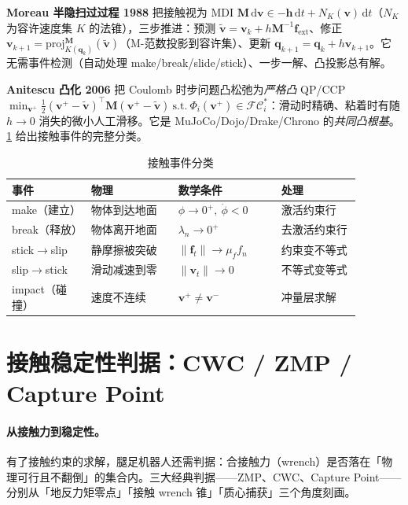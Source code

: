 \textbf{Moreau 半隐扫过过程 1988}\cite{moreau1988unilateral} 把接触视为 MDI $\mathbf M\,\mathrm d\mathbf v\in-\mathbf h\,\mathrm dt+N_K(\mathbf v)\,\mathrm dt$（$N_K$ 为容许速度集 $K$ 的法锥），三步推进：预测 $\tilde{\mathbf v}=\mathbf v_k+h\mathbf M^{-1}\mathbf f_{\text{ext}}$、修正 $\mathbf v_{k+1}=\mathrm{proj}_{K(\mathbf q_k)}^{\mathbf M}(\tilde{\mathbf v})$（M-范数投影到容许集）、更新 $\mathbf q_{k+1}=\mathbf q_k+h\mathbf v_{k+1}$。它无需事件检测（自动处理 make/break/slide/stick）、一步一解、凸投影总有解。

\textbf{Anitescu 凸化 2006}\cite{anitescu2006optimization} 把 Coulomb 时步问题凸松弛为\emph{严格凸} QP/CCP $\min_{\mathbf v^+}\tfrac12(\mathbf v^+-\tilde{\mathbf v})^\top\mathbf M(\mathbf v^+-\tilde{\mathbf v})\ \text{s.t.}\ \Phi_i(\mathbf v^+)\in\mathcal{FC}_i^*$：滑动时精确、粘着时有随 $h\to0$ 消失的微小人工滑移。它是 MuJoCo/Dojo/Drake/Chrono 的\emph{共同凸根基}。\cref{tab:cd-contact-events} 给出接触事件的完整分类。

\begin{table}[H]\centering\small
\caption{接触事件分类}
\label{tab:cd-contact-events}
\begin{tabular}{p{0.20\linewidth}p{0.22\linewidth}p{0.26\linewidth}p{0.20\linewidth}}
\toprule
事件 & 物理 & 数学条件 & 处理 \\
\midrule
make（建立） & 物体到达地面 & $\phi\to0^+,\ \dot\phi<0$ & 激活约束行 \\
break（释放） & 物体离开地面 & $\lambda_n\to0^+$ & 去激活约束行 \\
stick$\to$slip & 静摩擦被突破 & $\|\mathbf f_t\|\to\mu_f f_n$ & 约束变不等式 \\
slip$\to$stick & 滑动减速到零 & $\|\mathbf v_t\|\to0$ & 不等式变等式 \\
impact（碰撞） & 速度不连续 & $\mathbf v^+\neq\mathbf v^-$ & 冲量层求解 \\
\bottomrule
\end{tabular}
\end{table}

\section{接触稳定性判据：CWC / ZMP / Capture Point}
\label{sec:cd-cwc}

\paragraph{从接触力到稳定性。}
有了接触约束的求解，腿足机器人还需判据：合接触力（wrench）是否落在「物理可行且不翻倒」的集合内。三大经典判据——ZMP、CWC、Capture Point——分别从「地反力矩零点」「接触 wrench 锥」「质心捕获」三个角度刻画。

